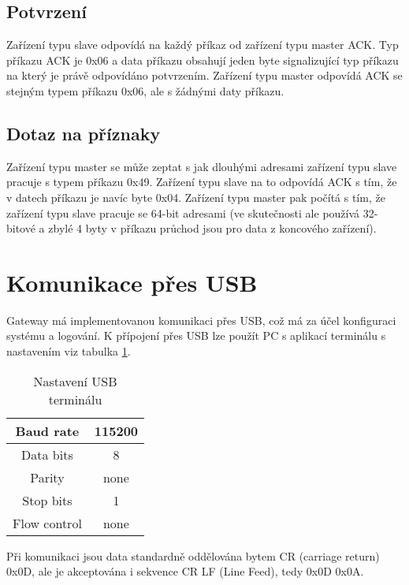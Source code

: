 \subsection{Potvrzení}
Zařízení typu slave odpovídá na každý příkaz od zařízení typu master ACK. Typ příkazu ACK je 0x06 a data příkazu obsahují jeden byte signalizující typ příkazu na který je právě odpovídáno potvrzením.
Zařízení typu master odpovídá ACK se stejným typem příkazu 0x06, ale s žádnými daty příkazu.

\subsection{Dotaz na příznaky}
Zařízení typu master se může zeptat s jak dlouhými adresami zařízení typu slave pracuje s typem příkazu 0x49. Zařízení typu slave na to odpovídá ACK s tím, že v datech příkazu je navíc byte 0x04. Zařízení typu master pak počítá s tím, že zařízení typu slave pracuje se 64-bit adresami (ve skutečnosti ale používá 32-bitové a zbylé 4 byty v příkazu průchod jsou pro data z koncového zařízení).

\section{Komunikace přes USB}
Gateway má implementovanou komunikaci přes USB, což má za účel konfiguraci systému a logování. K přípojení přes USB lze použít PC s  aplikací terminálu s nastavením viz tabulka \ref{table:usb_term}.

\begin{table}[!h]
    \centering
    \begin{tabular}{ |c|c| }
     \hline

     Baud rate              & 115200           \\ \hline
     Data bits              & 8                 \\ \hline
     Parity                 & none              \\ \hline
     Stop bits              & 1                 \\ \hline
     Flow control           & none               \\ \hline

    \end{tabular}
    \caption{Nastavení USB terminálu}
    \label{table:usb_term}
\end{table}

Při komunikaci jsou data standardně oddělována bytem CR (carriage return) 0x0D, ale je akceptována i sekvence CR LF (Line Feed), tedy 0x0D 0x0A. 

